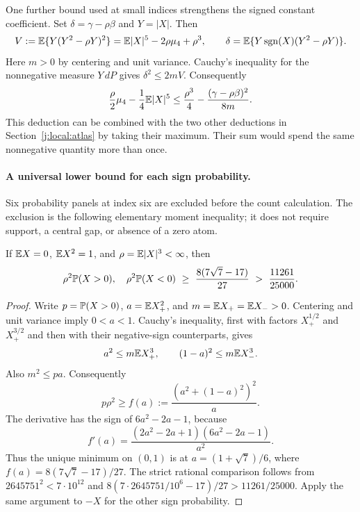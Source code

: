 One further bound used at small indices strengthens the signed constant
coefficient. Set $\delta=\gamma-\rho\beta$ and $Y=|X|$. Then
\[
 V:=\mathbb E\{Y(Y^2-\rho Y)^2\}
   =\mathbb E|X|^5-2\rho\mu_4+\rho^3,
 \qquad
 \delta=\mathbb E\{Y\operatorname{sgn}(X)(Y^2-\rho Y)\}.
\]
Here $m>0$ by centering and unit variance.
Cauchy's inequality for the nonnegative measure $Y\,dP$ gives
$\delta^2\le2mV$. Consequently
\begin{equation}\label{j:local:ext:weighted-cubic-loss}
 \frac\rho2\mu_4-\frac14\mathbb E|X|^5
 \le\frac{\rho^3}{4}-\frac{(\gamma-\rho\beta)^2}{8m}.
\end{equation}
This deduction can be combined with the two other deductions in
Section~\ref{j:local:atlas} by taking their maximum. Their sum would spend
the same nonnegative quantity more than once.



\paragraph{A universal lower bound for each sign probability.}
\label{j:local:ext:sign-mass}
Six probability panels at index six are excluded before the count
calculation. The exclusion is the following elementary moment inequality;
it does not require support, a central gap, or absence of a zero atom.

\begin{lemma}\label{j:local:sign-mass}
If $\mathbb E X=0$, $\mathbb E X^2=1$, and $\rho=\mathbb E|X|^3<\infty$, then
\[
 \rho^2\mathbb P(X>0),\quad \rho^2\mathbb P(X<0)
 \ \ge\ \frac{8(7\sqrt7-17)}{27}
 \ >\ \frac{11261}{25000}.
\]
\end{lemma}
\begin{proof}
Write $p=\mathbb P(X>0)$, $a=\mathbb E X_+^2$, and
$m=\mathbb E X_+=\mathbb E X_->0$. Centering and unit variance imply
$0<a<1$. Cauchy's inequality, first with factors
$X_+^{1/2}$ and $X_+^{3/2}$ and then with their negative-sign
counterparts, gives
\[
 a^2\le m\mathbb E X_+^3,\qquad (1-a)^2\le m\mathbb E X_-^3.
\]
Also $m^2\le pa$. Consequently
\[
 p\rho^2\ge f(a):=\frac{(a^2+(1-a)^2)^2}{a}.
\]
The derivative has the sign of $6a^2-2a-1$, because
\[
 f'(a)=\frac{(2a^2-2a+1)(6a^2-2a-1)}{a^2}.
\]
Thus the unique minimum on $(0,1)$ is at
$a=(1+\sqrt7)/6$, where
$f(a)=8(7\sqrt7-17)/27$. The strict rational comparison follows
from $2645751^2<7\cdot10^{12}$ and
$8(7\cdot2645751/10^6-17)/27>11261/25000$.
Apply the same argument to $-X$ for the other sign probability.
\end{proof}



